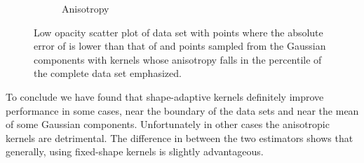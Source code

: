 \begin{figure}
\begin{subfigure}{0.23\textwidth}
					\caption{Anisotropy}
					\label{fig:discussion:ferdosi3Noise:anisotropy}
				\end{subfigure}			
				\caption{Low opacity scatter plot of data set \ferdosiThreeNoise with %
					 points where the absolute error of \mbe is lower than that of \sambe and %
					 points sampled from the Gaussian components with kernels whose anisotropy falls in the  percentile of the complete data set emphasized.}
				\label{fig:discussion:ferdosi3Noise}
			\end{figure}		

To conclude we have found that shape-adaptive kernels definitely improve performance in some cases, \ie near the boundary of the data sets and near the mean of some Gaussian components. Unfortunately in other cases the anisotropic kernels are detrimental. The difference in \mse between the two estimators shows that generally, using fixed-shape kernels is slightly advantageous. 